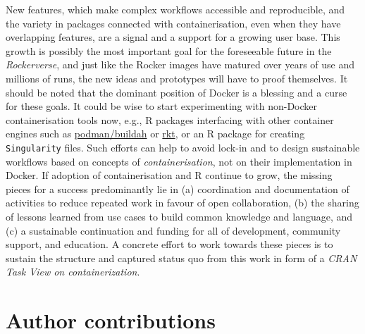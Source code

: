 New features, which make complex workflows accessible and reproducible,
and the variety in packages connected with containerisation, even when
they have overlapping features, are a signal and a support for a growing
user base. This growth is possibly the most important goal for the
foreseeable future in the \emph{Rockerverse}, and just like the Rocker
images have matured over years of use and millions of runs, the new
ideas and prototypes will have to proof themselves. It should be noted
that the dominant position of Docker is a blessing and a curse for these
goals. It could be wise to start experimenting with non-Docker
containerisation tools now, e.g., R packages interfacing with other
container engines such as
\href{https://github.com/containers/libpod}{podman/buildah} or
\href{https://coreos.com/rkt/}{rkt}, or an R package for creating
\texttt{Singularity} files. Such efforts can help to avoid lock-in and
to design sustainable workflows based on concepts of
\emph{containerisation}, not on their implementation in Docker. If
adoption of containerisation and R continue to grow, the missing pieces
for a success predominantly lie in (a) coordination and documentation of
activities to reduce repeated work in favour of open collaboration, (b)
the sharing of lessons learned from use cases to build common knowledge
and language, and (c) a sustainable continuation and funding for all of
development, community support, and education. A concrete effort to work
towards these pieces is to sustain the structure and captured status quo
from this work in form of a \emph{CRAN Task View on containerization}.

\hypertarget{author-contributions}{%
\section{Author contributions}\label{author-contributions}}

